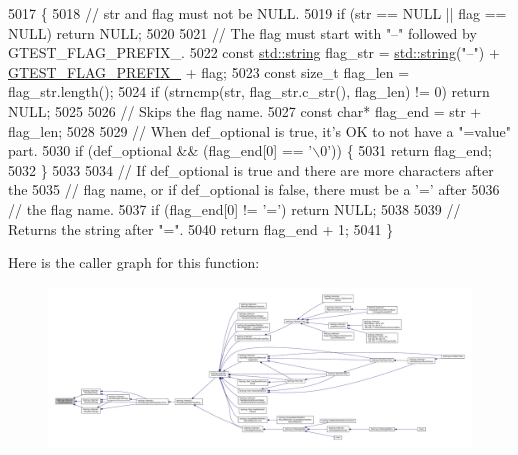 \begin{DoxyCode}
5017                                               \{
5018   \textcolor{comment}{// str and flag must not be NULL.}
5019   \textcolor{keywordflow}{if} (str == NULL || flag == NULL) \textcolor{keywordflow}{return} NULL;
5020 
5021   \textcolor{comment}{// The flag must start with "--" followed by GTEST\_FLAG\_PREFIX\_.}
5022   \textcolor{keyword}{const} \hyperlink{namespacetesting_1_1internal_a8e8ff5b11e64078831112677156cb111}{std::string} flag\_str = \hyperlink{namespacetesting_1_1internal_a8e8ff5b11e64078831112677156cb111}{std::string}(\textcolor{stringliteral}{"--"}) + 
      \hyperlink{gtest-port_8h_a088e84784c589ba9b1fc48602ad8eabf}{GTEST\_FLAG\_PREFIX\_} + flag;
5023   \textcolor{keyword}{const} \textcolor{keywordtype}{size\_t} flag\_len = flag\_str.length();
5024   \textcolor{keywordflow}{if} (strncmp(str, flag\_str.c\_str(), flag\_len) != 0) \textcolor{keywordflow}{return} NULL;
5025 
5026   \textcolor{comment}{// Skips the flag name.}
5027   \textcolor{keyword}{const} \textcolor{keywordtype}{char}* flag\_end = str + flag\_len;
5028 
5029   \textcolor{comment}{// When def\_optional is true, it's OK to not have a "=value" part.}
5030   \textcolor{keywordflow}{if} (def\_optional && (flag\_end[0] == \textcolor{charliteral}{'\(\backslash\)0'})) \{
5031     \textcolor{keywordflow}{return} flag\_end;
5032   \}
5033 
5034   \textcolor{comment}{// If def\_optional is true and there are more characters after the}
5035   \textcolor{comment}{// flag name, or if def\_optional is false, there must be a '=' after}
5036   \textcolor{comment}{// the flag name.}
5037   \textcolor{keywordflow}{if} (flag\_end[0] != \textcolor{charliteral}{'='}) \textcolor{keywordflow}{return} NULL;
5038 
5039   \textcolor{comment}{// Returns the string after "=".}
5040   \textcolor{keywordflow}{return} flag\_end + 1;
5041 \}
\end{DoxyCode}
Here is the caller graph for this function\+:
\nopagebreak
\begin{figure}[H]
\begin{center}
\leavevmode
\includegraphics[width=350pt]{namespacetesting_1_1internal_a8bfd56af5e4a89bfb76f7e1723e41b03_icgraph}
\end{center}
\end{figure}
\mbox{\label{namespacetesting_1_1internal_a137bff8177d6158f59ab4ce603577293}} 
